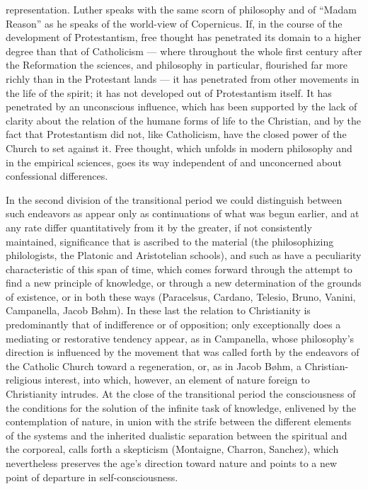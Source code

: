 representation. Luther speaks with the same scorn of philosophy and of
``Madam Reason'' as he speaks of the world-view of Copernicus. If, in
the course of the development of Protestantism, free thought has
penetrated its domain to a higher degree than that of Catholicism ---
where throughout the whole first century after the Reformation the
sciences, and philosophy in particular, flourished far more richly than
in the Protestant lands --- it has penetrated from other movements in
the life of the spirit; it has not developed out of Protestantism
itself. It has penetrated by an unconscious influence, which has been
supported by the lack of clarity about the relation of the humane forms
of life to the Christian, and by the fact that Protestantism did not,
like Catholicism, have the closed power of the Church to set against
it. Free thought, which unfolds in modern philosophy and in the
empirical sciences, goes its way independent of and unconcerned about
confessional differences.

\divrule

In the second division of the transitional period we could distinguish
between such endeavors as appear only as continuations of what was begun
earlier, and at any rate differ quantitatively from it by the
greater, if not consistently maintained, significance that is ascribed to
the material (the philosophizing philologists, the Platonic and
Aristotelian schools), and such as have a peculiarity characteristic of
this span of time, which comes forward through the attempt to find a new
principle of knowledge, or through a new determination of the grounds of
existence, or in both these ways (Paracelsus, Cardano, Telesio, Bruno,
Vanini, Campanella, Jacob Bøhm). In these last the relation to
Christianity is predominantly that of indifference or of opposition; only
exceptionally does a mediating or restorative tendency appear, as in
Campanella, whose philosophy's direction is influenced by the movement
that was called forth by the endeavors of the Catholic Church toward a
regeneration, or, as in Jacob Bøhm, a Christian-religious interest, into
which, however, an element of nature foreign to Christianity intrudes. At
the close of the transitional period the consciousness of the conditions
for the solution of the infinite task of knowledge, enlivened by the
contemplation of nature, in union with the strife between the different
elements of the systems and the inherited dualistic separation between
the spiritual and the corporeal, calls forth a skepticism (Montaigne,
Charron, Sanchez), which nevertheless preserves the age's direction
toward nature and points to a new point of departure in
self-consciousness.

